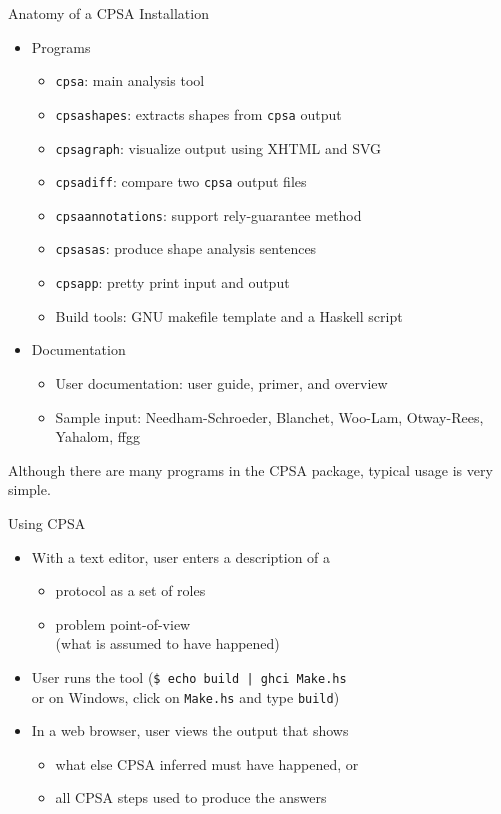 \documentclass[landscape]{slides}
\newcommand{\cpsa}{CPSA}
\newenvironment{zitemize}
{\begin{itemize}
\setlength{\itemsep}{0em}
\setlength{\topsep}{0em}
\setlength{\partopsep}{0em}
\setlength{\parsep}{0em}
\setlength{\parskip}{0em}}%
{\end{itemize}}
\begin{document}
\begin{mitreslide}{Anatomy of a CPSA Installation}
\begin{zitemize}
\item Programs
\begin{zitemize}
\item \texttt{cpsa}: main analysis tool
\item \texttt{cpsashapes}: extracts shapes from \texttt{cpsa} output
\item \texttt{cpsagraph}: visualize output using XHTML and SVG
\item \texttt{cpsadiff}: compare two \texttt{cpsa} output files
\item \texttt{cpsaannotations}: support rely-guarantee method
\item \texttt{cpsasas}: produce shape analysis sentences
\item \texttt{cpsapp}: pretty print input and output
\item Build tools: GNU makefile template and a Haskell script
\end{zitemize}
\item Documentation
\begin{zitemize}
\item User documentation: user guide, primer, and overview
\item Sample input: Needham-Schroeder, Blanchet, Woo-Lam, Otway-Rees,
  Yahalom, ffgg
\end{zitemize}
\end{zitemize}
\end{mitreslide}

\begin{note}
  Although there are many programs in the {\cpsa} package, typical
  usage is very simple.
\end{note}

\begin{mitreslide}{Using CPSA}
\begin{itemize}
\item With a text editor, user enters a description of a
\begin{zitemize}
\item protocol as a set of roles
\item problem point-of-view\\ (what is assumed to have happened)
\end{zitemize}
\item User runs the tool (\texttt{\$ echo build | ghci Make.hs} \\
  or on Windows, click on \texttt{Make.hs} and type \texttt{build})
\item In a web browser, user views the output that shows
\begin{zitemize}
\item what else CPSA inferred must have happened, or
\item all CPSA steps used to produce the answers
\end{zitemize}
\end{itemize}
\end{mitreslide}
\end{document}
